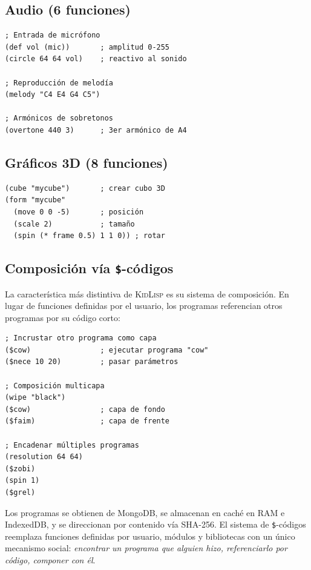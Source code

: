 \documentclass[10pt,letterpaper,twocolumn]{article}
\newcommand{\kl}{\textsc{KidLisp}}
\begin{document}
\subsection{Audio (6 funciones)}

\begin{lstlisting}
; Entrada de micrófono
(def vol (mic))       ; amplitud 0-255
(circle 64 64 vol)    ; reactivo al sonido

; Reproducción de melodía
(melody "C4 E4 G4 C5")

; Armónicos de sobretonos
(overtone 440 3)      ; 3er armónico de A4
\end{lstlisting}

\subsection{Gráficos 3D (8 funciones)}

\begin{lstlisting}
(cube "mycube")       ; crear cubo 3D
(form "mycube"
  (move 0 0 -5)       ; posición
  (scale 2)           ; tamaño
  (spin (* frame 0.5) 1 1 0)) ; rotar
\end{lstlisting}

\subsection{Composición vía \texttt{\$}-códigos}

La característica más distintiva de \kl{} es su sistema de composición. En lugar de funciones definidas por el usuario, los programas referencian otros programas por su código corto:

\begin{lstlisting}
; Incrustar otro programa como capa
($cow)                ; ejecutar programa "cow"
($nece 10 20)         ; pasar parámetros

; Composición multicapa
(wipe "black")
($cow)                ; capa de fondo
($faim)               ; capa de frente

; Encadenar múltiples programas
(resolution 64 64)
($zobi)
(spin 1)
($grel)
\end{lstlisting}

Los programas se obtienen de MongoDB, se almacenan en caché en RAM e IndexedDB, y se direccionan por contenido vía SHA-256. El sistema de \texttt{\$}-códigos reemplaza funciones definidas por usuario, módulos y bibliotecas con un único mecanismo social: \emph{encontrar un programa que alguien hizo, referenciarlo por código, componer con él}.
\end{document}
